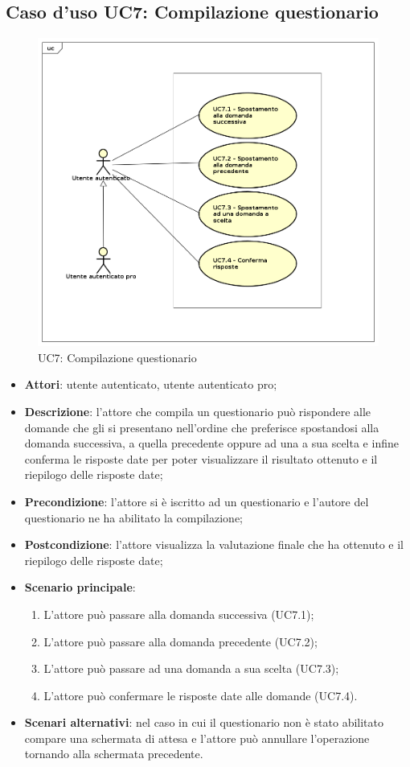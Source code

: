 \newpage
\subsection{Caso d'uso UC7: Compilazione questionario}
\label{UC7}
\begin{figure}[ht]
\centering
\includegraphics[scale=0.5,keepaspectratio]{UML/UC7.png}
\caption{UC7: Compilazione questionario}
\end{figure}
\FloatBarrier
\begin{itemize}
\item\textbf{Attori}: utente autenticato, utente autenticato pro;
\item\textbf{Descrizione}: l'attore che compila un questionario può rispondere alle domande che gli si presentano nell'ordine che preferisce spostandosi alla domanda successiva, a quella precedente oppure ad una a sua scelta e infine conferma le risposte date per poter visualizzare il risultato ottenuto e il riepilogo delle risposte date;
\item\textbf{Precondizione}: l'attore si è iscritto ad un questionario e l'autore del questionario ne ha abilitato la compilazione;
\item\textbf{Postcondizione}: l'attore visualizza la valutazione finale che ha ottenuto e il riepilogo delle risposte date;
\item\textbf{Scenario principale}:
\begin{enumerate}
\item L'attore può passare alla domanda successiva (UC7.1);
\item L'attore può passare alla domanda precedente (UC7.2);
\item L'attore può passare ad una domanda a sua scelta (UC7.3);
\item L'attore può confermare le risposte date alle domande (UC7.4).
\end{enumerate}
\item\textbf{Scenari alternativi}: nel caso in cui il questionario non è stato abilitato compare una schermata di attesa e l'attore può annullare l'operazione tornando alla schermata precedente.
\end{itemize}

